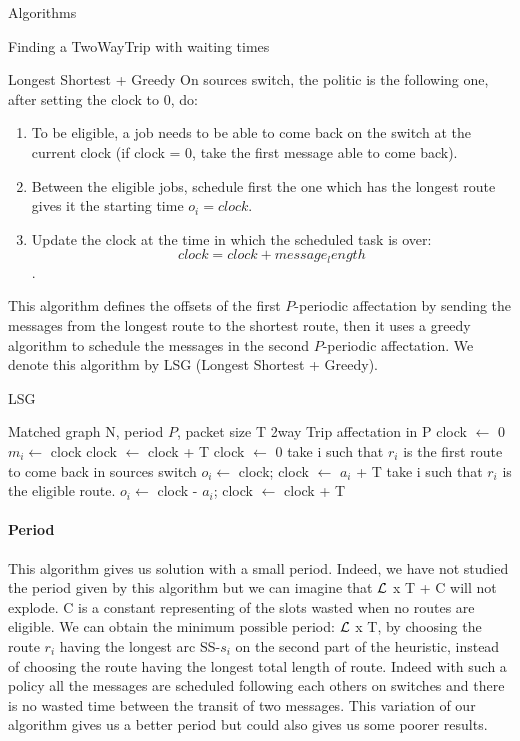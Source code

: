 \documentclass[a4paper,10pt]{report}
\begin{document}
\begin{chapter}{Algorithms}
\begin{section}{Finding a TwoWayTrip with waiting times}
\begin{subsection}{Longest Shortest + Greedy}
On sources switch, the politic is the following one, after setting the clock to 0, do:
\begin{enumerate}
 \item To be eligible, a job needs to be able to come back on the switch at the current clock (if clock = 0, take the first message able to come back).
 \item Between the eligible jobs, schedule first the one which has the longest route gives it the starting time $o_i = clock$.
 \item Update the clock at the time in which the scheduled task is over: $$clock = clock + message_length$$.
\end{enumerate}

This algorithm defines the offsets of the first $P$-periodic affectation by sending the messages from the longest route to the shortest route, then it uses a greedy algorithm to schedule the messages in the second $P$-periodic affectation. We denote this algorithm by LSG (Longest Shortest + Greedy).

\begin{algorithm}[H]
\caption{LSG}
\begin{algorithmic}
\REQUIRE Matched graph N, period $P$, packet size T
\ENSURE 2way Trip affectation in P
\STATE clock $\leftarrow$ 0
\STATE  $m_i \leftarrow$ clock
\STATE clock $\leftarrow$ clock + T
\ENDFOR
\STATE clock $\leftarrow$ 0
\STATE take i such that $r_i$ is the first route to come back in sources switch
\STATE $o_i \leftarrow $ clock;
\STATE clock $\leftarrow$ $a_i$ + T
\STATE take i such that $r_i$ is the eligible route.
\STATE $o_i \leftarrow $ clock - $a_i$;
\STATE clock $\leftarrow$ clock + T

\ENDWHILE

\end{algorithmic}
\end{algorithm}


\paragraph{Period}
This algorithm gives us solution with a small period. Indeed, we have not studied the period given by this algorithm but we can imagine that ${\cal L}$ x T + C will not explode. C is a constant representing of the slots wasted when no routes are eligible.
We can obtain the minimum possible period: ${\cal L}$ x T, by choosing the route $r_i$ having the longest arc SS-$s_i$ on the second part of the heuristic, instead of choosing the route having the longest total length of route. Indeed with such a policy all the messages are scheduled following each others on switches and there is no wasted time between the transit of two messages.
This variation of our algorithm gives us a better period but could also gives us some poorer results.


\end{subsection}
\end{section}
\end{chapter}
\end{document}
